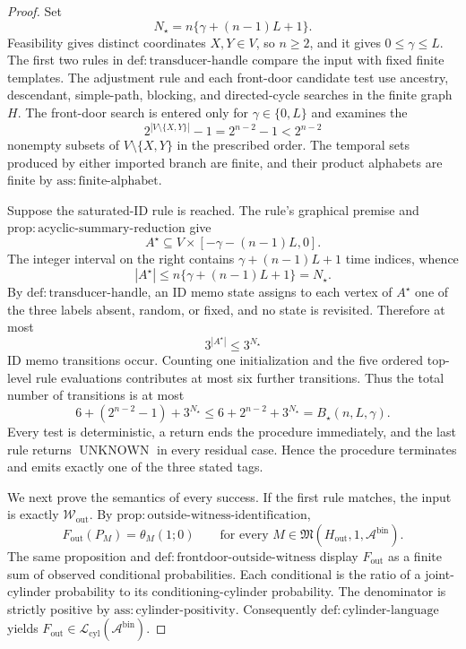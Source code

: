 \documentclass{article}
\begin{document}
\begin{proof}
Set
\[
N_\star=n\{\gamma+(n-1)L+1\}.
\]
Feasibility gives distinct coordinates \(X,Y\in V\), so \(n\geq 2\), and it gives \(0\leq\gamma\leq L\).  The first two rules in \(\mathrm{def:transducer\text{-}handle}\) compare the input with fixed finite templates.  The adjustment rule and each front-door candidate test use ancestry, descendant, simple-path, blocking, and directed-cycle searches in the finite graph \(H\).  The front-door search is entered only for \(\gamma\in\{0,L\}\) and examines the
\[
2^{|V\setminus\{X,Y\}|}-1=2^{n-2}-1<2^{n-2}
\]
nonempty subsets of \(V\setminus\{X,Y\}\) in the prescribed order.  The temporal sets produced by either imported branch are finite, and their product alphabets are finite by \(\mathrm{ass:finite\text{-}alphabet}\).

Suppose the saturated-ID rule is reached.  The rule's graphical premise and \(\mathrm{prop:acyclic\text{-}summary\text{-}reduction}\) give
\[
A^\star\subseteq V\times[-\gamma-(n-1)L,0].
\]
The integer interval on the right contains \(\gamma+(n-1)L+1\) time indices, whence
\[
|A^\star|\leq n\{\gamma+(n-1)L+1\}=N_\star.
\]
By \(\mathrm{def:transducer\text{-}handle}\), an ID memo state assigns to each vertex of \(A^\star\) one of the three labels absent, random, or fixed, and no state is revisited.  Therefore at most
\[
3^{|A^\star|}\leq 3^{N_\star}
\]
ID memo transitions occur.  Counting one initialization and the five ordered top-level rule evaluations contributes at most six further transitions.  Thus the total number of transitions is at most
\[
6+(2^{n-2}-1)+3^{N_\star}
\leq 6+2^{n-2}+3^{N_\star}
=B_\star(n,L,\gamma).
\]
Every test is deterministic, a return ends the procedure immediately, and the last rule returns \(\operatorname{UNKNOWN}\) in every residual case.  Hence the procedure terminates and emits exactly one of the three stated tags.

We next prove the semantics of every success.  If the first rule matches, the input is exactly \(\mathcal W_{\mathrm{out}}\).  By \(\mathrm{prop:outside\text{-}witness\text{-}identification}\),
\[
F_{\mathrm{out}}(P_M)=\theta_M(1;0)
\qquad
\text{for every }M\in\mathfrak M(H_{\mathrm{out}},1,\mathcal A^{\mathrm{bin}}).
\]
The same proposition and \(\mathrm{def:frontdoor\text{-}outside\text{-}witness}\) display \(F_{\mathrm{out}}\) as a finite sum of observed conditional probabilities.  Each conditional is the ratio of a joint-cylinder probability to its conditioning-cylinder probability.  The denominator is strictly positive by \(\mathrm{ass:cylinder\text{-}positivity}\).  Consequently \(\mathrm{def:cylinder\text{-}language}\) yields \(F_{\mathrm{out}}\in\mathcal L_{\mathrm{cyl}}(\mathcal A^{\mathrm{bin}})\).


\end{proof}
\end{document}
